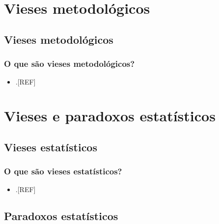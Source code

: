 \documentclass[
  a4paper,
]{book}
\providecommand{\tightlist}{%
  \setlength{\itemsep}{0pt}\setlength{\parskip}{0pt}}
\begin{document}
\hypertarget{vieses-metodologicos}{%
\chapter{\texorpdfstring{\textbf{Vieses metodológicos}}{Vieses metodológicos}}\label{vieses-metodologicos}}

\hypertarget{vieses-metodologicos}{%
\section{Vieses metodológicos}\label{vieses-metodologicos}}

\hypertarget{o-que-suxe3o-vieses-metodoluxf3gicos}{%
\subsection{O que são vieses metodológicos?}\label{o-que-suxe3o-vieses-metodoluxf3gicos}}

\begin{itemize}
\tightlist
\item
  .{[}REF{]}
\end{itemize}

\hypertarget{vieses-paradoxos-estatuxedsticos}{%
\chapter{\texorpdfstring{\textbf{Vieses e paradoxos estatísticos}}{Vieses e paradoxos estatísticos}}\label{vieses-paradoxos-estatuxedsticos}}

\hypertarget{vieses-estatisticos}{%
\section{Vieses estatísticos}\label{vieses-estatisticos}}

\hypertarget{o-que-suxe3o-vieses-estatuxedsticos}{%
\subsection{O que são vieses estatísticos?}\label{o-que-suxe3o-vieses-estatuxedsticos}}

\begin{itemize}
\tightlist
\item
  .{[}REF{]}
\end{itemize}

\hypertarget{paradoxos}{%
\section{Paradoxos estatísticos}\label{paradoxos}}
\end{document}
